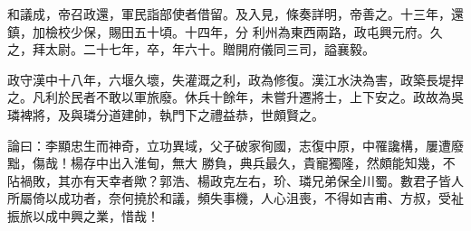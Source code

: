 \begin{pinyinscope}
 和議成，帝召政還，軍民詣部使者借留。及入見，條奏詳明，帝善之。十三年，還鎮，加檢校少保，賜田五十頃。十四年，分
 利州為東西兩路，政屯興元府。久之，拜太尉。二十七年，卒，年六十。贈開府儀同三司，謚襄毅。



 政守漢中十八年，六堰久壞，失灌溉之利，政為修復。漢江水決為害，政築長堤捍之。凡利於民者不敢以軍旅廢。休兵十餘年，未嘗升遷將士，上下安之。政故為吳璘裨將，及與璘分道建帥，執門下之禮益恭，世頗賢之。



 論曰：李顯忠生而神奇，立功異域，父子破家徇國，志復中原，中罹讒構，屢遭廢黜，傷哉！楊存中出入淮甸，無大
 勝負，典兵最久，貴寵獨隆，然頗能知幾，不阽禍敗，其亦有天幸者歟？郭浩、楊政克左右，玠、璘兄弟保全川蜀。數君子皆人所屬倚以成功者，奈何撓於和議，頻失事機，人心沮喪，不得如吉甫、方叔，受祉振旅以成中興之業，惜哉！



\end{pinyinscope}